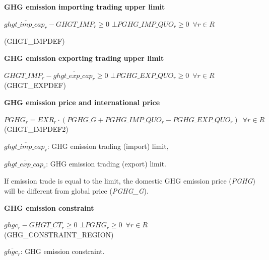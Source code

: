 \documentclass[10pt,a4paper,titlepage,dvipdfmx]{book}
\begin{document}
\begin{flushleft}\textbf{GHG emission importing trading upper limit}\end{flushleft}

$\overline{ghgt\_ imp\_ cap_{r}}-GHGT\_ IMP_{r}\geq 0\,\,\bot PGHG\_ IMP\_ QUO_{r}\geq 0\,\,\,\forall r\in R$
\begin{center}(GHGT\_IMPDEF)
\end{center}


\begin{flushleft}\textbf{GHG emission exporting trading upper limit}\end{flushleft}


\begin{center}$GHGT\_ IMP_{r}-\overline{ghgt\_ exp\_ cap_{r}}\geq 0\,\,\bot PGHG\_ EXP\_ QUO_{r}\geq 0\,\,\,\forall r\in R$ (GHGT\_EXPDEF)
\end{center}

\begin{flushleft}\textbf{GHG emission price and international price }\end{flushleft}


\begin{center}$PGHG_{r}=EXR_{r}\cdot \left(PGHG\_ G+PGHG\_ IMP\_ QUO_{r}-PGHG\_ EXP\_ QUO_{r}\right)\,\,\,\forall r\in R$ (GHGT\_IMPDEF2)
\end{center}

\begin{flushleft}
$\overline{ghgt\_ imp\_ cap_{r}}$: GHG emission trading (import) limit,

$\overline{ghgt\_ exp\_ cap_{r}}$: GHG emission trading (export) limit.
\end{flushleft}

If emission trade is equal to the limit, the domestic GHG emission price (\textit{PGHG}) will be different from global price (\textit{PGHG\_G}). 

\begin{flushleft}\textbf{GHG emission constraint}\end{flushleft}


\begin{center}$\overline{ghgc_{r}}-GHGT\_ CT_{r}\geq 0\,\,\bot PGHG_{r}\geq 0\,\,\,\forall r\in R$               (GHG\_CONSTRAINT\_REGION)
\end{center}

\begin{flushleft} $\overline{ghgc_{r}}$: GHG emission constraint. \end{flushleft}
\end{document}
